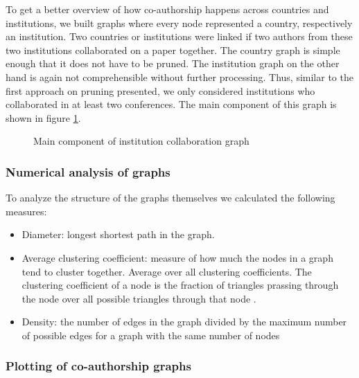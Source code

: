 \documentclass[article,twocolumn]{IEEEtran}
\providecommand{\tightlist}{%
      \setlength{\itemsep}{0pt}\setlength{\parskip}{0pt}}
\begin{document}
To get a better overview of how co-authorship happens across countries
and institutions, we built graphs where every node represented a
country, respectively an institution. Two countries or institutions were
linked if two authors from these two institutions collaborated on a
paper together. The country graph is simple enough that it does not have
to be pruned. The institution graph on the other hand is again not
comprehensible without further processing. Thus, similar to the first
approach on pruning presented, we only considered institutions who
collaborated in at least two conferences. The main component of this
graph is shown in figure \ref{unigraph}.


    \begin{figure}
        \begin{center}\end{center}
        \caption{Main component of institution collaboration graph}
        \label{unigraph}
    \end{figure}
    
    \hypertarget{numerical-analysis-of-graphs}{%
\subsubsection{Numerical analysis of
graphs}\label{numerical-analysis-of-graphs}}

To analyze the structure of the graphs themselves we calculated the
following measures:

\begin{itemize}
\tightlist
\item
  Diameter: longest shortest path in the graph.
\item
  Average clustering coefficient: measure of how much the nodes in a
  graph tend to cluster together. Average over all clustering
  coefficients. The clustering coefficient of a node is the fraction of
  triangles prassing through the node over all possible triangles
  through that node \cite{watts1998collective}.
\item
  Density: the number of edges in the graph divided by the maximum
  number of possible edges for a graph with the same number of nodes
\end{itemize}

    \hypertarget{plotting-of-co-authorship-graphs}{%
\subsubsection{Plotting of co-authorship
graphs}\label{plotting-of-co-authorship-graphs}}
\end{document}
